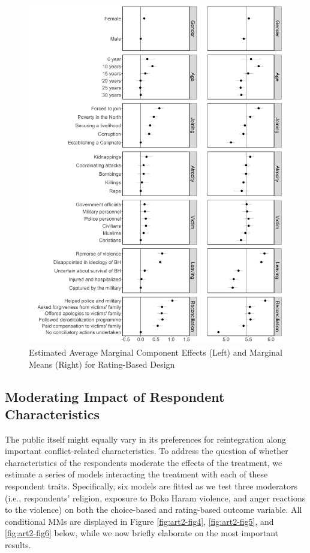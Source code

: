 \vspace{3mm}
\begin{figure}[H]
\includegraphics[width=\textwidth]{Chapter_3/art2-figure3.jpeg}
\caption{Estimated Average Marginal Component Effects (Left) and Marginal Means (Right) for Rating-Based Design}
\label{fig:art2-fig3}    
\end{figure}

\newpage
\subsection{Moderating Impact of Respondent Characteristics }
The public itself might equally vary in its preferences for reintegration along important conflict-related characteristics. To address the question of whether characteristics of the respondents moderate the effects of the treatment, we estimate a series of models interacting the treatment with each of these respondent traits. Specifically, six models are fitted as we test three moderators (i.e., respondents' religion, exposure to Boko Haram violence, and anger reactions to the violence) on both the choice-based and rating-based outcome variable. All conditional MMs are displayed in Figure \ref{fig:art2-fig4}, \ref{fig:art2-fig5}, and \ref{fig:art2-fig6} below, while we now briefly elaborate on the most important results.

